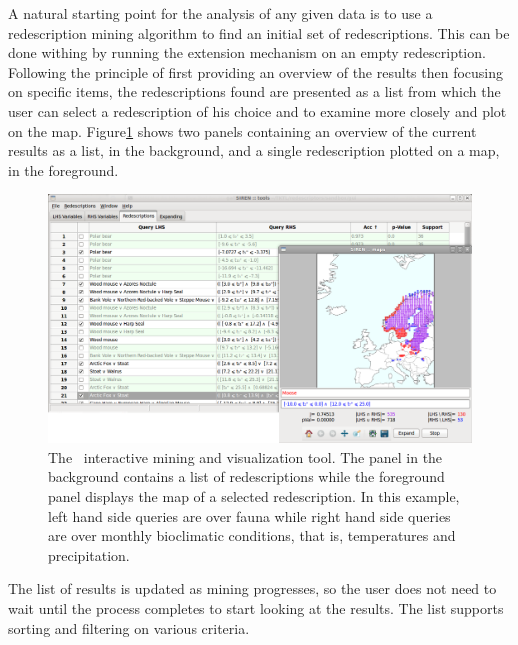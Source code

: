 
 A natural starting point for the
analysis of any given data is to use a redescription mining algorithm
to find an initial set of redescriptions.  This can be done withing
\Siren{} by running the extension mechanism on an empty redescription.
Following the principle of first providing an overview of the results
then focusing on specific items, the redescriptions found are
presented as a list from which the user can select a redescription of
his choice and to examine more closely and plot on the map.
Figure\ref{fig:both_panels} shows two panels containing an overview of
the current results as a list, in the background, and a single
redescription plotted on a map, in the foreground.

\begin{figure}[t]
  \centering
\includegraphics[width=\textwidth]{screenshots/both_panels_02}
  \caption{The \Siren\ interactive mining and visualization tool. The panel in the background contains a list of redescriptions while the foreground panel displays the map of a selected redescription.  In this example, left hand side queries are over fauna while right hand side queries are over monthly bioclimatic conditions, that is, temperatures and precipitation.}
  \label{fig:both_panels}
\end{figure}


The list of results is updated as mining progresses, so the user does
not need to wait until the process completes to start looking at the
results. The list supports sorting and filtering on various criteria.

